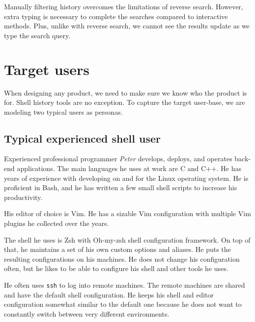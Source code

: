 Manually filtering history overcomes the limitations of reverse search. However, extra typing is necessary to complete the searches compared to interactive methods. Plus, unlike with reverse search, we cannot see the results update as we type the search query.


\section{Target users}

When designing any product, we need to make sure we know who the product is for. Shell history tools are no exception. To capture the target user-base, we are modeling two typical users as personas.


\subsection{Typical experienced shell user}

Experienced professional programmer \textit{Peter} develops, deploys, and operates back-end applications. The main languages he uses at work are C and C++. He has years of experience with developing on and for the Linux operating system. He is proficient in Bash, and he has written a few small shell scripts to increase his productivity.

His editor of choice is Vim. He has a sizable Vim configuration with multiple Vim plugins he collected over the years.

The shell he uses is Zsh with Oh-my-zsh \cite{toolsohmyzsh} shell configuration framework. On top of that, he maintains a set of his own custom options and aliases. He puts the resulting configurations on his machines. He does not change his configuration often, but he likes to be able to configure his shell and other tools he uses.

He often uses \verb|ssh| to log into remote machines. The remote machines are shared and have the default shell configuration. He keeps his shell and editor configuration somewhat similar to the default one because he does not want to constantly switch between very different environments. 

